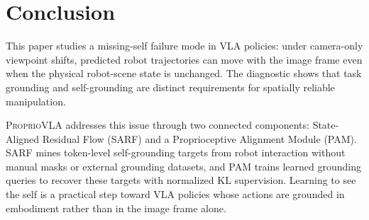\section{Conclusion}

This paper studies a missing-self failure mode in VLA policies: under
camera-only viewpoint shifts, predicted robot trajectories can move with the
image frame even when the physical robot-scene state is unchanged. The
diagnostic shows that task grounding and self-grounding are distinct
requirements for spatially reliable manipulation.

\textsc{ProprioVLA} addresses this issue through two connected components:
State-Aligned Residual Flow (SARF) and a Proprioceptive Alignment Module (PAM).
SARF mines token-level self-grounding targets from robot interaction without
manual masks or external grounding datasets, and PAM trains learned grounding
queries to recover these targets with normalized KL supervision.
Learning to see the self is a practical step toward VLA policies whose actions
are grounded in embodiment rather than in the image frame alone.
